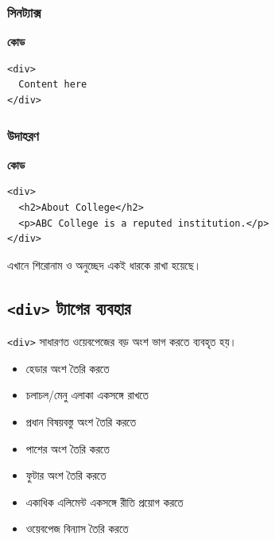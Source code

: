 \par\noindent
\begin{minipage}[t]{.42\linewidth}\vspace{0pt}\small
\subsubsection{সিনট্যাক্স}

\textbf{\color{chFourTeal}কোড}\par
\begin{verbatim}
<div>
  Content here
</div>
\end{verbatim}

\par\smallskip
\end{minipage}\hfill
\begin{minipage}[t]{.54\linewidth}\vspace{0pt}\small
\subsubsection{উদাহরণ}

\textbf{\color{chFourTeal}কোড}\par
\begin{verbatim}
<div>
  <h2>About College</h2>
  <p>ABC College is a reputed institution.</p>
</div>
\end{verbatim}

\par\smallskip


এখানে শিরোনাম ও অনুচ্ছেদ একই ধারকে রাখা হয়েছে।
\end{minipage}\par
\subsection{\texttt{<div>} ট্যাগের ব্যবহার}

\texttt{<div>} সাধারণত ওয়েবপেজের বড় অংশ ভাগ করতে ব্যবহৃত হয়।

\par\noindent
\begin{minipage}[t]{.48\linewidth}\vspace{0pt}
\begin{itemize}
\item হেডার অংশ তৈরি করতে
\item চলাচল/মেনু এলাকা একসঙ্গে রাখতে
\item প্রধান বিষয়বস্তু অংশ তৈরি করতে
\item পাশের অংশ তৈরি করতে
\end{itemize}
\end{minipage}\hfill
\begin{minipage}[t]{.48\linewidth}\vspace{0pt}
\begin{itemize}
\item ফুটার অংশ তৈরি করতে
\item একাধিক এলিমেন্ট একসঙ্গে রীতি প্রয়োগ করতে
\item ওয়েবপেজ বিন্যাস তৈরি করতে
\end{itemize}
\end{minipage}\par


